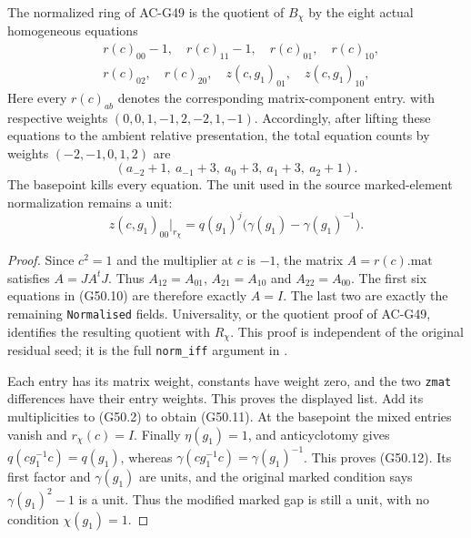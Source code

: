 \begin{proposition}
\label{AC-G50-normalization}
The normalized ring of AC-G49 is the quotient of $B_\chi$
by the eight actual homogeneous equations
\[
 \begin{split}
 &r(c)_{00}-1,\quad r(c)_{11}-1,\quad r(c)_{01},\quad r(c)_{10},\\
 &r(c)_{02},\quad r(c)_{20},\quad z(c,g_1)_{01},\quad z(c,g_1)_{10},
 \end{split}                                                  \tag{G50.10}
\]
Here every $r(c)_{ab}$ denotes the corresponding matrix-component
entry.
with respective weights
$(0,0,1,-1,2,-2,1,-1)$.
Accordingly, after lifting these equations to the ambient
relative presentation, the total equation counts by
weights $(-2,-1,0,1,2)$ are
\[
                 (a_{-2}+1,\ a_{-1}+3,\ a_0+3,
                                      \ a_1+3,\ a_2+1).      \tag{G50.11}
\]
The basepoint kills every equation.  The unit used in the
source marked-element normalization remains a unit:
\[
                z(c,g_1)_{00}\big|_{r_\chi}
                   =q(g_1)^j\bigl(\gamma(g_1)-\gamma(g_1)^{-1}\bigr).
                                                                  \tag{G50.12}
\]
\end{proposition}
\begin{proof}
Since $c^2=1$ and the multiplier at $c$ is $-1$, the
matrix $A=r(c).\mathrm{mat}$ satisfies
$A=JA^tJ$.  Thus $A_{12}=A_{01}$,
$A_{21}=A_{10}$ and $A_{22}=A_{00}$.
The first six equations in (G50.10) are therefore exactly
$A=I$.  The last two are exactly the remaining
\texttt{Normalised} fields.
Universality, or the quotient proof of AC-G49, identifies
the resulting quotient with $R_\chi$.
This proof is independent of the original residual seed;
it is the full \texttt{norm\_iff} argument in
.

Each entry has its matrix weight, constants have weight
zero, and the two \texttt{zmat} differences have their
entry weights.  This proves the displayed list.  Add its
multiplicities to (G50.2) to obtain (G50.11).
At the basepoint the mixed entries vanish and $r_\chi(c)=I$.
Finally $\eta(g_1)=1$, and anticyclotomy gives
$q(cg_1^{-1}c)=q(g_1)$, whereas
$\gamma(cg_1^{-1}c)=\gamma(g_1)^{-1}$.
This proves (G50.12).  Its first factor and
$\gamma(g_1)$ are units, and the original marked
condition says $\gamma(g_1)^2-1$ is a unit.
Thus the modified marked gap is still a unit, with no
condition $\chi(g_1)=1$.
\end{proof}

